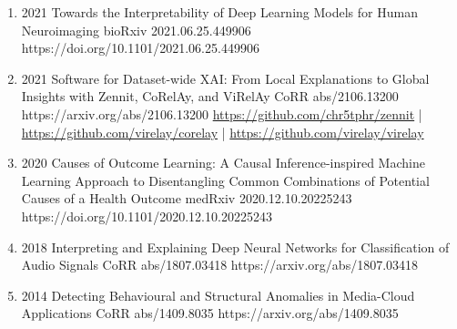 \documentclass[10pt,a4paper]{article} %
\begin{document}
{\begin{enumerate}
        \item {}
                            {2021}
                            {Towards the Interpretability of Deep Learning Models for Human Neuroimaging}
                            {bioRxiv 2021.06.25.449906}
                            {https://doi.org/10.1101/2021.06.25.449906}

        \item {}
                            {2021}
                            {Software for Dataset-wide XAI: From Local Explanations to Global Insights with Zennit, CoRelAy, and ViRelAy}
                            {CoRR abs/2106.13200}
                            {https://arxiv.org/abs/2106.13200}
                            {   \href{https://github.com/chr5tphr/zennit}{https://github.com/chr5tphr/zennit} | \\
                                \href{https://github.com/virelay/corelay}{https://github.com/virelay/corelay} |
                                \href{https://github.com/virelay/virelay}{https://github.com/virelay/virelay}
                            }

        \item {}
                            {2020}
                            {Causes of Outcome Learning: A Causal Inference-inspired Machine Learning Approach to Disentangling Common Combinations of Potential Causes of a Health Outcome}
                            {medRxiv 2020.12.10.20225243}
                            {https://doi.org/10.1101/2020.12.10.20225243}

        \item {}
                            {2018}
                            {Interpreting and Explaining Deep Neural Networks for Classification of Audio Signals}
                            {CoRR abs/1807.03418}
                            {https://arxiv.org/abs/1807.03418}

        \item {}
                            {2014}
                            {Detecting Behavioural and Structural Anomalies in Media-Cloud Applications}
                            {CoRR abs/1409.8035}
                            {https://arxiv.org/abs/1409.8035}

    \end{enumerate}

}
\end{document}
